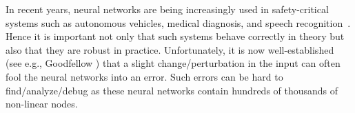 









In recent years, neural networks are being increasingly used in safety-critical systems such as autonomous vehicles, medical diagnosis, and speech recognition~\cite{bojarski2016end,amato2013artificial,hinton2012deep}. Hence it is important not only that such systems behave correctly in theory but also that they are robust in practice. Unfortunately, it is now well-established (see e.g., Goodfellow \cite{goodfellow2014explaining}) that a slight change/perturbation in the input can often fool the neural networks into an error. Such errors can be hard to find/analyze/debug as these neural networks contain hundreds of thousands of non-linear nodes.

